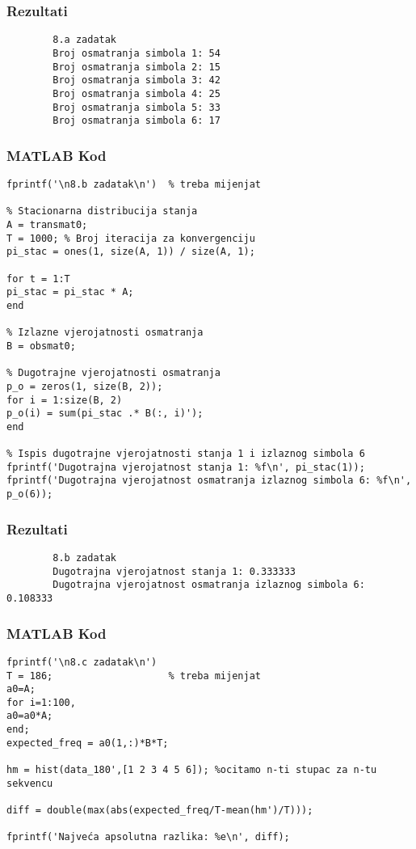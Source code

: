 \documentclass[12pt]{article}
\begin{document}
	\subsubsection*{Rezultati}
	\begin{verbatim}
		8.a zadatak
		Broj osmatranja simbola 1: 54
		Broj osmatranja simbola 2: 15
		Broj osmatranja simbola 3: 42
		Broj osmatranja simbola 4: 25
		Broj osmatranja simbola 5: 33
		Broj osmatranja simbola 6: 17
	\end{verbatim}
	
	\subsubsection*{MATLAB Kod}
	\begin{lstlisting}
fprintf('\n8.b zadatak\n')  % treba mijenjat

% Stacionarna distribucija stanja
A = transmat0;
T = 1000; % Broj iteracija za konvergenciju
pi_stac = ones(1, size(A, 1)) / size(A, 1);

for t = 1:T
pi_stac = pi_stac * A;
end

% Izlazne vjerojatnosti osmatranja
B = obsmat0;

% Dugotrajne vjerojatnosti osmatranja
p_o = zeros(1, size(B, 2));
for i = 1:size(B, 2)
p_o(i) = sum(pi_stac .* B(:, i)');
end

% Ispis dugotrajne vjerojatnosti stanja 1 i izlaznog simbola 6
fprintf('Dugotrajna vjerojatnost stanja 1: %f\n', pi_stac(1));
fprintf('Dugotrajna vjerojatnost osmatranja izlaznog simbola 6: %f\n', p_o(6));
	\end{lstlisting}
	
	\subsubsection*{Rezultati}
	\begin{verbatim}
		8.b zadatak
		Dugotrajna vjerojatnost stanja 1: 0.333333
		Dugotrajna vjerojatnost osmatranja izlaznog simbola 6: 0.108333
	\end{verbatim}
	
	\subsubsection*{MATLAB Kod}
	\begin{lstlisting}
fprintf('\n8.c zadatak\n')
T = 186;                    % treba mijenjat
a0=A; 
for i=1:100, 
a0=a0*A; 
end;
expected_freq = a0(1,:)*B*T;

hm = hist(data_180',[1 2 3 4 5 6]); %ocitamo n-ti stupac za n-tu sekvencu

diff = double(max(abs(expected_freq/T-mean(hm')/T)));

fprintf('Najveća apsolutna razlika: %e\n', diff);
	\end{lstlisting}
	
\end{document}
